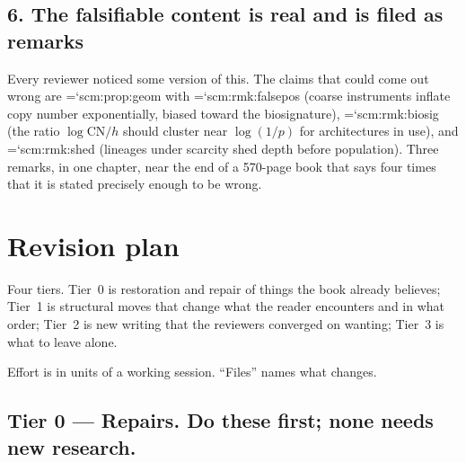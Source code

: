 \documentclass[11pt,letterpaper]{article}
\newcommand{\loc}[1]{{\small\ttfamily\color{accent}\hyphenchar\font=`\-\relax #1}}
\newcommand{\CN}{\mathrm{CN}}
\begin{document}
\subsection*{6. The falsifiable content is real and is filed as remarks}

Every reviewer noticed some version of this. The claims that could come
out wrong are \loc{scm:prop:geom} with \loc{scm:rmk:falsepos} (coarse
instruments inflate copy number exponentially, biased toward the
biosignature), \loc{scm:rmk:biosig} (the ratio $\log \CN / h$ should
cluster near $\log(1/p)$ for architectures in use), and
\loc{scm:rmk:shed} (lineages under scarcity shed depth before
population). Three remarks, in one chapter, near the end of a
570-page book that says four times that it is stated precisely enough
to be wrong.

\clearpage
\section{Revision plan}

Four tiers. Tier~0 is restoration and repair of things the book already
believes; Tier~1 is structural moves that change what the reader
encounters and in what order; Tier~2 is new writing that the reviewers
converged on wanting; Tier~3 is what to leave alone.

Effort is in units of a working session. ``Files'' names what changes.

\subsection*{Tier 0 --- Repairs. Do these first; none needs new research.}
\end{document}
